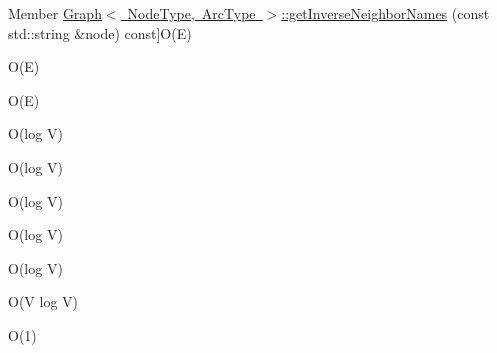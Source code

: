\begin{DoxyRefList}
Member \mbox{\hyperlink{classGraph_ac3dc36bc1eb0f249180cfe78bce6e7a2}{Graph$<$ Node\+Type, Arc\+Type $>$\+:\+:get\+Inverse\+Neighbor\+Names}} (const std\+::string \&node) const]O(\+E)  
\item[\label{BigOh__BigOh000069}%
\Hypertarget{BigOh__BigOh000069}%
Member \mbox{\hyperlink{classGraph_a80a5724c594b9bd0b6008c57b09af317}{Graph$<$ Node\+Type, Arc\+Type $>$\+:\+:get\+Inverse\+Neighbors}} (Node\+Type $\ast$node) const]O(\+E)  
\item[\label{BigOh__BigOh000070}%
\Hypertarget{BigOh__BigOh000070}%
Member \mbox{\hyperlink{classGraph_a5294846b9cdd19394808e3736ec67004}{Graph$<$ Node\+Type, Arc\+Type $>$\+:\+:get\+Inverse\+Neighbors}} (const std\+::string \&node) const]O(\+E)  
\item[\label{BigOh__BigOh000071}%
\Hypertarget{BigOh__BigOh000071}%
Member \mbox{\hyperlink{classGraph_ae9b5cbd2bcb3918c4c64b1eb71c1a3a8}{Graph$<$ Node\+Type, Arc\+Type $>$\+:\+:get\+Neighbor\+Names}} (Node\+Type $\ast$node) const]O(log V)  
\item[\label{BigOh__BigOh000072}%
\Hypertarget{BigOh__BigOh000072}%
Member \mbox{\hyperlink{classGraph_a6175b4d672266465dd34e070c7710b34}{Graph$<$ Node\+Type, Arc\+Type $>$\+:\+:get\+Neighbor\+Names}} (const std\+::string \&node) const]O(log V)  
\item[\label{BigOh__BigOh000073}%
\Hypertarget{BigOh__BigOh000073}%
Member \mbox{\hyperlink{classGraph_a0e49b167f0623a8ae76040c3e5eab3fb}{Graph$<$ Node\+Type, Arc\+Type $>$\+:\+:get\+Neighbors}} (Node\+Type $\ast$node) const]O(log V)  
\item[\label{BigOh__BigOh000074}%
\Hypertarget{BigOh__BigOh000074}%
Member \mbox{\hyperlink{classGraph_a3a3720906c380f36b50530419330bfe5}{Graph$<$ Node\+Type, Arc\+Type $>$\+:\+:get\+Neighbors}} (const std\+::string \&node) const]O(log V)  
\item[\label{BigOh__BigOh000075}%
\Hypertarget{BigOh__BigOh000075}%
Member \mbox{\hyperlink{classGraph_a81487976cf0e576047333c85463c33aa}{Graph$<$ Node\+Type, Arc\+Type $>$\+:\+:get\+Node}} (const std\+::string \&name) const]O(log V)  
\item[\label{BigOh__BigOh000076}%
\Hypertarget{BigOh__BigOh000076}%
Member \mbox{\hyperlink{classGraph_a3c6f37932f377dd2bf4fec61343a916d}{Graph$<$ Node\+Type, Arc\+Type $>$\+:\+:get\+Node\+Names}} () const]O(\+V log V)  
\item[\label{BigOh__BigOh000077}%
\Hypertarget{BigOh__BigOh000077}%
Member \mbox{\hyperlink{classGraph_abd5552888f57aaa581099e8146c617c9}{Graph$<$ Node\+Type, Arc\+Type $>$\+:\+:get\+Node\+Set}} () const]O(1)  

\end{DoxyRefList}

